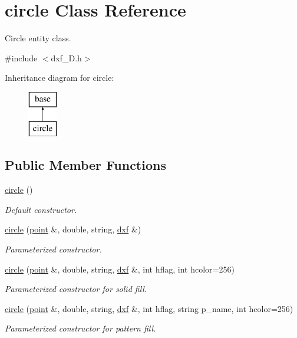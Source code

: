 \hypertarget{classcircle}{\section{circle Class Reference}
\label{classcircle}
}


Circle entity class.  




{\ttfamily \#include $<$dxf\-\_\-D.\-h$>$}

Inheritance diagram for circle\-:\begin{figure}[H]
\begin{center}
\leavevmode
\includegraphics[height=2.000000cm]{classcircle}
\end{center}
\end{figure}
\subsection*{Public Member Functions}
\begin{DoxyCompactItemize}
\item 
\hypertarget{classcircle_a4e0786fc75051f3bbe5de2e08ef9712d}{\hyperlink{classcircle_a4e0786fc75051f3bbe5de2e08ef9712d}{circle} ()}\label{classcircle_a4e0786fc75051f3bbe5de2e08ef9712d}

\begin{DoxyCompactList}\small\item\em Default constructor. \end{DoxyCompactList}\item 
\hyperlink{classcircle_a265f35d522e8d1bf2a3953146caec09e}{circle} (\hyperlink{classpoint}{point} \&, double, string, \hyperlink{classdxf}{dxf} \&)
\begin{DoxyCompactList}\small\item\em Parameterized constructor. \end{DoxyCompactList}\item 
\hyperlink{classcircle_a6824eba724e2ec93029fd50423d13008}{circle} (\hyperlink{classpoint}{point} \&, double, string, \hyperlink{classdxf}{dxf} \&, int hflag, int hcolor=256)
\begin{DoxyCompactList}\small\item\em Parameterized constructor for solid fill. \end{DoxyCompactList}\item 
\hyperlink{classcircle_a4a17fabc4fe9f4da10f30cd8272ed8b5}{circle} (\hyperlink{classpoint}{point} \&, double, string, \hyperlink{classdxf}{dxf} \&, int hflag, string p\-\_\-name, int hcolor=256)
\begin{DoxyCompactList}\small\item\em Parameterized constructor for pattern fill. \end{DoxyCompactList}\end{DoxyCompactItemize}
